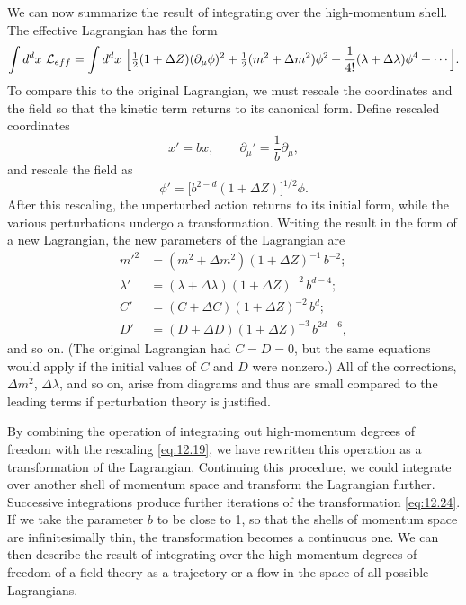 We can now summarize the result of integrating over the high-momentum shell.
The effective Lagrangian has the form
\begin{equation}
  \int d^dx\ \mathcal{L}_{eff} = \int d^dx\ \Bigl[
    \tfrac{1}{2}(1+\Delta Z)(\partial_\mu\phi)^2 + \tfrac{1}{2}
      (m^2+\Delta m^2)\phi^2 + \frac{1}{4!}(\lambda+\Delta\lambda)\phi^4
      + \cdots \Bigr] .
  \label{eq:12.18}
\end{equation}
To compare this to the original Lagrangian, we must rescale the coordinates
and the field so that the kinetic term returns to its canonical form.  Define
rescaled coordinates
\begin{equation}
  x' = bx,\qquad \partial_\mu' = \frac{1}{b}\partial_\mu ,
  \label{eq:12.19}
\end{equation}
and rescale the field as
\begin{equation}
  \phi' = \bigl[ b^{2-d}(1+\Delta Z) \bigr]^{1/2}\phi .
  \label{eq:12.22}
\end{equation}
After this rescaling, the unperturbed action returns to its initial form,
while the various perturbations undergo a transformation.  Writing the result
in the form of a new Lagrangian, the new parameters of the Lagrangian are
\begin{equation}
  \begin{aligned}
    m'^2 &= (m^2+\Delta m^2)(1+\Delta Z)^{-1}\,b^{-2};\\
    \lambda' &= (\lambda+\Delta\lambda)(1+\Delta Z)^{-2}\,b^{d-4};\\
    C' &= (C+\Delta C)(1+\Delta Z)^{-2}\,b^d;\\
    D' &= (D+\Delta D)(1+\Delta Z)^{-3}\,b^{2d-6} ,
  \end{aligned}
  \label{eq:12.24}
\end{equation}
and so on.  (The original Lagrangian had $C = D = 0$, but the same equations
would apply if the initial values of $C$ and $D$ were nonzero.)  All of the
corrections, $\Delta m^2$, $\Delta\lambda$, and so on, arise from diagrams and
thus are small compared to the leading terms if perturbation theory is
justified.

By combining the operation of integrating out high-momentum degrees of
freedom with the rescaling \eqref{eq:12.19}, we have rewritten this operation
as a transformation of the Lagrangian.  Continuing this procedure, we could
integrate over another shell of momentum space and transform the Lagrangian
further.  Successive integrations produce further iterations of the
transformation \eqref{eq:12.24}.  If we take the parameter $b$ to be close to
1, so that the shells of momentum space are infinitesimally thin, the
transformation becomes a continuous one.  We can then describe the result of
integrating over the high-momentum degrees of freedom of a field theory as a
trajectory or a flow in the space of all possible Lagrangians.

